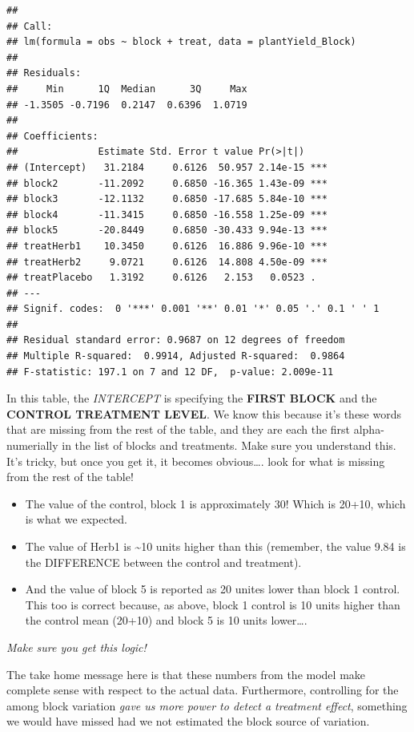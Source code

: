 \documentclass[
]{book}
\providecommand{\tightlist}{%
  \setlength{\itemsep}{0pt}\setlength{\parskip}{0pt}}
\begin{document}
\begin{verbatim}
## 
## Call:
## lm(formula = obs ~ block + treat, data = plantYield_Block)
## 
## Residuals:
##     Min      1Q  Median      3Q     Max 
## -1.3505 -0.7196  0.2147  0.6396  1.0719 
## 
## Coefficients:
##              Estimate Std. Error t value Pr(>|t|)    
## (Intercept)   31.2184     0.6126  50.957 2.14e-15 ***
## block2       -11.2092     0.6850 -16.365 1.43e-09 ***
## block3       -12.1132     0.6850 -17.685 5.84e-10 ***
## block4       -11.3415     0.6850 -16.558 1.25e-09 ***
## block5       -20.8449     0.6850 -30.433 9.94e-13 ***
## treatHerb1    10.3450     0.6126  16.886 9.96e-10 ***
## treatHerb2     9.0721     0.6126  14.808 4.50e-09 ***
## treatPlacebo   1.3192     0.6126   2.153   0.0523 .  
## ---
## Signif. codes:  0 '***' 0.001 '**' 0.01 '*' 0.05 '.' 0.1 ' ' 1
## 
## Residual standard error: 0.9687 on 12 degrees of freedom
## Multiple R-squared:  0.9914, Adjusted R-squared:  0.9864 
## F-statistic: 197.1 on 7 and 12 DF,  p-value: 2.009e-11
\end{verbatim}

In this table, the \emph{INTERCEPT} is specifying the \textbf{FIRST BLOCK} and the \textbf{CONTROL TREATMENT LEVEL}. We know this because it's these words that are missing from the rest of the table, and they are each the first alpha-numerially in the list of blocks and treatments. Make sure you understand this. It's tricky, but once you get it, it becomes obvious\ldots. look for what is missing from the rest of the table!

\begin{itemize}
\tightlist
\item
  The value of the control, block 1 is approximately 30! Which is 20+10, which is what we expected.
\item
  The value of Herb1 is \textasciitilde10 units higher than this (remember, the value 9.84 is the DIFFERENCE between the control and treatment).
\item
  And the value of block 5 is reported as 20 unites lower than block 1 control. This too is correct because, as above, block 1 control is 10 units higher than the control mean (20+10) and block 5 is 10 units lower\ldots.
\end{itemize}

\emph{Make sure you get this logic!}

The take home message here is that these numbers from the model make complete sense with respect to the actual data. Furthermore, controlling for the among block variation \emph{gave us more power to detect a treatment effect}, something we would have missed had we not estimated the block source of variation.
\end{document}
